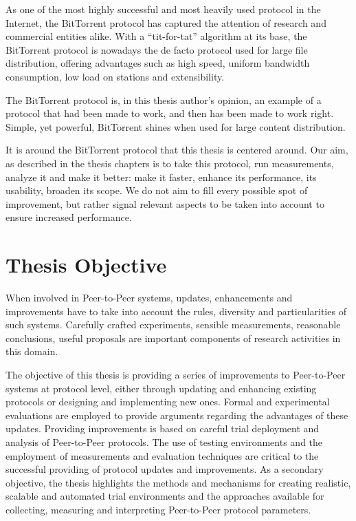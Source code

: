 As one of the most highly successful and most heavily used protocol in the
Internet, the BitTorrent protocol has captured the attention of research and
commercial entities alike. With a ``tit-for-tat'' algorithm at its base, the
BitTorrent protocol is nowadays the de facto protocol used for large file
distribution, offering advantages such as high speed, uniform bandwidth
consumption, low load on stations and extensibility.

The BitTorrent protocol is, in this thesis author's opinion, an example of a
protocol that had been made to work, and then has been made to work right.
Simple, yet powerful, BitTorrent shines when used for large content
distribution.

It is around the BitTorrent protocol that this thesis is centered around. Our
aim, as described in the thesis chapters is to take this protocol, run
measurements, analyze it and make it better: make it faster, enhance its
performance, its usability, broaden its scope. We do not aim to fill every
possible spot of improvement, but rather signal relevant aspects to be taken
into account to ensure increased performance.

\section{Thesis Objective}
\label{sec:intro:objective}

When involved in Peer-to-Peer systems, updates, enhancements and improvements
have to take into account the rules, diversity and particularities of such
systems. Carefully crafted experiments, sensible measurements, reasonable
conclusions, useful proposals are important components of research activities
in this domain.

The objective of this thesis is providing a series of improvements to
Peer-to-Peer systems at protocol level, either through updating and enhancing
existing protocols or designing and implementing new ones. Formal and
experimental evaluations are employed to provide arguments regarding the
advantages of these updates. Providing improvements is based on careful
trial deployment and analysis of Peer-to-Peer protocols. The use of testing
environments and the employment of measurements and evaluation techniques are
critical to the successful providing of protocol updates and improvements. As
a secondary objective, the thesis highlights the methods and mechanisms for
creating realistic, scalable and automated trial environments and the
approaches available for collecting, measuring and interpreting Peer-to-Peer
protocol parameters.

